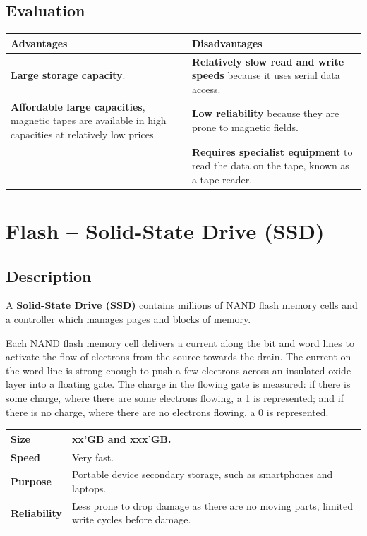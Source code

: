 \documentclass[a4paper]{systems-software}
\begin{document}
\newpage

\subsection*{Evaluation}

\begin{longtabu} to \textwidth {| X[1,l] | X[1,l] |}
    \hline
    \textbf{Advantages} & \textbf{Disadvantages}
	\\ \hline
	\textbf{Large storage capacity}. & \textbf{Relatively slow read and write speeds} because it uses serial data access.
	\\ \hline
	\textbf{Affordable large capacities}, magnetic tapes are available in high capacities at relatively low prices & \textbf{Low reliability} because they are prone to magnetic fields.
	\\ \hline
	& \textbf{Requires specialist equipment} to read the data on the tape, known as a tape reader.
	\\ \hline
\end{longtabu}


\section*{Flash -- Solid-State Drive (SSD)}

\subsection*{Description}

A \textbf{Solid-State Drive (SSD)} contains millions of NAND flash memory cells and a controller which manages pages and blocks of memory.

Each NAND flash memory cell delivers a current along the bit and word lines to activate the flow of electrons from the source towards the drain. The current on the word line is strong enough to push a few electrons across an insulated oxide layer into a floating gate. The charge in the flowing gate is measured: if there is some charge, where there are some electrons flowing, a 1 is represented; and if there is no charge, where there are no electrons flowing, a 0 is represented.

\begin{longtabu} to \textwidth {| X[1,l] | X[6,l] |}
    \hline
    \textbf{Size} & xx’GB and xxx’GB.
	\\ \hline
	\textbf{Speed} & Very fast.
	\\ \hline
	\textbf{Purpose} & Portable device secondary storage, such as smartphones and laptops.
	\\ \hline
	\textbf{Reliability} & Less prone to drop damage as there are no moving parts, limited write cycles before damage.
	\\ \hline
\end{longtabu}
\end{document}
